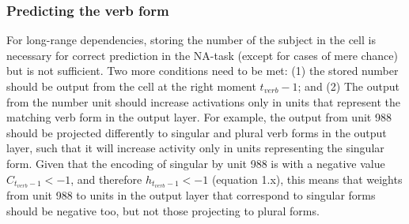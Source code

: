 \subsubsection{Predicting the verb form}
For long-range dependencies, storing the number of the subject in the cell is necessary for correct prediction in the NA-task (except for cases of mere chance) but is not sufficient. 
Two more conditions need to be met: (1) the stored number should be output from the cell at the right moment $t_{verb}-1$; and (2) The output from the number unit should increase activations only in units that represent the matching verb form in the output layer. 
For example, the output from unit 988 should be projected differently to singular and plural verb forms in the output layer, such that it will increase activity only in units representing the singular form. 
Given that the encoding of singular by unit 988 is with a negative value $C_{t_{verb}-1}<-1$, and therefore $h_{t_{verb}-1}<-1$ (equation 1.x), this means that weights from unit 988 to units in the output layer that correspond to singular forms should be negative too, but not those projecting to plural forms.



